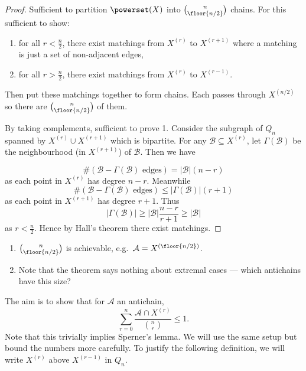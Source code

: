 \documentclass[a4paper]{article}
\begin{document}
\begin{proof}
  Sufficient to partition \(\powerset(X)\) into \(\binom{n}{\floor{n/2}}\) chains. For this sufficient to show:
  \begin{enumerate}
  \item for all \(r < \frac{n}{2}\), there exist matchings from \(X^{(r)}\) to \(X^{(r + 1)}\) where a matching is just a set of non-adjacent edges,
  \item for all \(r > \frac{n}{2}\), there exist matchings from \(X^{(r)}\) to \(X^{(r - 1)}\).
  \end{enumerate}
  Then put these matchings together to form chains. Each passes through \(X^{(n/2)}\) so there are \(\binom{n}{\floor{n/2}}\) of them.

  By taking complements, sufficient to prove 1. Consider the subgraph of \(Q_n\) spanned by \(X^{(r)} \cup X^{(r + 1)}\) which is bipartite. For any \(\mathcal B \subseteq X^{(r)}\), let \(\Gamma(\mathcal B)\) be the neighbourhood (in \(X^{(r + 1)}\)) of \(\mathcal B\). Then we have

  \[
    \# (\mathcal B - \Gamma(\mathcal B) \text{ edges}) = |\mathcal B| (n - r)
  \]
  as each point in \(X^{(r)}\) has degree \(n - r\). Meanwhile
  \[
    \# (\mathcal B - \Gamma(\mathcal B) \text{ edges}) \leq |\Gamma(\mathcal B)| (r + 1)
  \]
  as each point in \(X^{(r + 1)}\) has degree \(r + 1\). Thus
  \[
    |\Gamma(\mathcal B)| \geq |\mathcal B| \frac{n - r}{r + 1} \geq |\mathcal B|
  \]
  as \(r < \frac{n}{2}\). Hence by Hall's theorem there exist matchings.
\end{proof}

\begin{remark}\leavevmode
  \begin{enumerate}
  \item \(\binom{n}{\floor{n/2}}\) is achievable, e.g.\ \(\mathcal A = X^{(\floor{n/2})}\).
  \item Note that the theorem says nothing about extremal cases --- which antichains have this size?
  \end{enumerate}
\end{remark}

The aim is to show that for \(\mathcal A\) an antichain,
\[
  \sum_{r = 0}^n \frac{\mathcal A \cap X^{(r)}}{\binom{n}{r}} \leq 1.
\]
Note that this trivially implies Sperner's lemma. We will use the same setup but bound the numbers more carefully. To justify the following definition, we will write \(X^{(r)}\) above \(X^{(r - 1)}\) in \(Q_n\).
\end{document}
